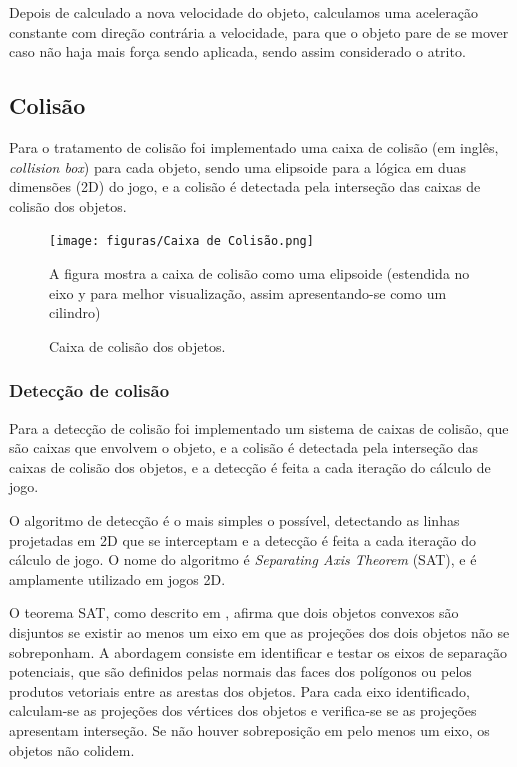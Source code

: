 Depois de calculado a nova velocidade do objeto, calculamos uma aceleração constante com direção contrária a velocidade, para que o objeto pare de se mover caso não haja mais força sendo aplicada, sendo assim considerado o atrito.

\subsection{Colisão}

Para o tratamento de colisão foi implementado uma caixa de colisão (em inglês, \textit{collision box}) para cada objeto, sendo uma elipsoide para a lógica em duas dimensões (2D) do jogo, e a colisão é detectada pela interseção das caixas de colisão dos objetos.

\begin{figure}[H]
    \centering
    \texttt{[image: figuras/Caixa de Colisão.png]}
    \caption{Caixa de colisão dos objetos.}
    \footnotesize{A figura mostra a caixa de colisão como uma elipsoide (estendida no eixo y para melhor visualização, assim apresentando-se como um cilindro)}
    \label{fig:collision-box}
\end{figure}

\subsubsection{Detecção de colisão}

Para a detecção de colisão foi implementado um sistema de caixas de colisão, que são caixas que envolvem o objeto, e a colisão é detectada pela interseção das caixas de colisão dos objetos, e a detecção é feita a cada iteração do cálculo de jogo.

O algoritmo de detecção é o mais simples o possível, detectando as linhas projetadas em 2D que se interceptam e a detecção é feita a cada iteração do cálculo de jogo. O nome do algoritmo é \textit{Separating Axis Theorem} (SAT), e é amplamente utilizado em jogos 2D.

O teorema SAT, como descrito em \cite{SAT:separatingAxisTheorem}, afirma que dois objetos convexos são disjuntos se existir ao menos um eixo em que as projeções dos dois objetos não se sobreponham. A abordagem consiste em identificar e testar os eixos de separação potenciais, que são definidos pelas normais das faces dos polígonos ou pelos produtos vetoriais entre as arestas dos objetos. Para cada eixo identificado, calculam-se as projeções dos vértices dos objetos e verifica-se se as projeções apresentam interseção. Se não houver sobreposição em pelo menos um eixo, os objetos não colidem.

